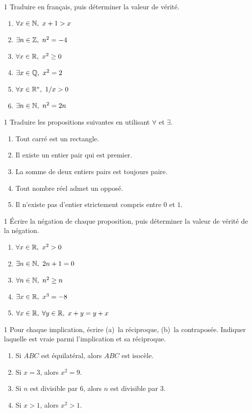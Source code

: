 \begin{exo}{1}
Traduire en fran\c cais, puis d\'eterminer la valeur de v\'erit\'e.
\begin{enumerate}
  \item $\forall x \in \mathbb{N},\ x+1 > x$
  \item $\exists n \in \mathbb{Z},\ n^2 = -4$
  \item $\forall x \in \mathbb{R},\ x^2 \geq 0$
  \item $\exists x \in \mathbb{Q},\ x^2 = 2$
  \item $\forall x \in \mathbb{R}^*,\ 1/x > 0$
  \item $\exists n \in \mathbb{N},\ n^2 = 2n$
\end{enumerate}
\end{exo}

\begin{exo}{1}
Traduire les propositions suivantes en utilisant $\forall$ et $\exists$.
\begin{enumerate}
  \item Tout carr\'e est un rectangle.
  \item Il existe un entier pair qui est premier.
  \item La somme de deux entiers pairs est toujours paire.
  \item Tout nombre r\'eel admet un oppos\'e.
  \item Il n'existe pas d'entier strictement compris entre $0$ et $1$.
\end{enumerate}
\end{exo}

\begin{exo}{1}
\'Ecrire la n\'egation de chaque proposition, puis d\'eterminer la valeur
de v\'erit\'e de la n\'egation.
\begin{enumerate}
  \item $\forall x \in \mathbb{R},\ x^2 > 0$
  \item $\exists n \in \mathbb{N},\ 2n+1 = 0$
  \item $\forall n \in \mathbb{N},\ n^2 \geq n$
  \item $\exists x \in \mathbb{R},\ x^3 = -8$
  \item $\forall x \in \R,\; \forall y \in \R,\ x + y = y + x$
\end{enumerate}
\end{exo}

\begin{exo}{1}
Pour chaque implication, \'ecrire (a)~la r\'eciproque,
(b)~la contrapos\'ee.
Indiquer laquelle est vraie parmi l'implication et sa r\'eciproque.
\begin{enumerate}
  \item Si $ABC$ est \'equilat\'eral, alors $ABC$ est isoc\`ele.
  \item Si $x = 3$, alors $x^2 = 9$.
  \item Si $n$ est divisible par $6$, alors $n$ est divisible par $3$.
  \item Si $x > 1$, alors $x^2 > 1$.
\end{enumerate}
\end{exo}

